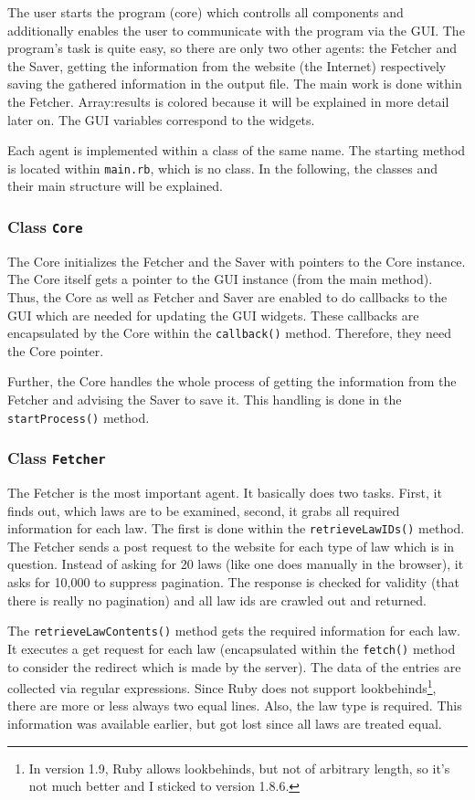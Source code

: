 \documentclass{scrartcl}
\begin{document}
The user starts the program (core) which controlls all components and additionally enables the user to communicate with the program via the GUI. The program's task is quite easy, so there are only two other agents: the Fetcher and the Saver, getting the information from the website (the Internet) respectively saving the gathered information in the output file. The main work is done within the Fetcher. Array:results is colored because it will be explained in more detail later on. The GUI variables correspond to the widgets.

Each agent is implemented within a class of the same name. The starting method is located within \texttt{main.rb}, which is no class. In the following, the classes and their main structure will be explained.



\subsubsection{Class \texttt{Core}}
The Core initializes the Fetcher and the Saver with pointers to the Core instance. The Core itself gets a pointer to the GUI instance (from the main method). Thus, the Core as well as Fetcher and Saver are enabled to do callbacks to the GUI which are needed for updating the GUI widgets. These callbacks are encapsulated by the Core within the \texttt{callback()} method. Therefore, they need the Core pointer.

Further, the Core handles the whole process of getting the information from the Fetcher and advising the Saver to save it. This handling is done in the \texttt{startProcess()} method.



\subsubsection{Class \texttt{Fetcher}}
The Fetcher is the most important agent. It basically does two tasks. First, it finds out, which laws are to be examined, second, it grabs all required information for each law. The first is done within the \texttt{retrieveLawIDs()} method. The Fetcher sends a post request to the website for each type of law which is in question. Instead of asking for 20 laws (like one does manually in the browser), it asks for 10,000 to suppress pagination. The response is checked for validity (that there is really no pagination) and all law ids are crawled out and returned.

The \texttt{retrieveLawContents()} method gets the required information for each law. It executes a get request for each law (encapsulated within the \texttt{fetch()} method to consider the redirect which is made by the server). The data of the entries are collected via regular expressions. Since Ruby does not support lookbehinds\footnote{In version 1.9, Ruby allows lookbehinds, but not of arbitrary length, so it's not much better and I sticked to version 1.8.6.}, there are more or less always two equal lines. Also, the law type is required. This information was available earlier, but got lost since all laws are treated equal.
\end{document}
